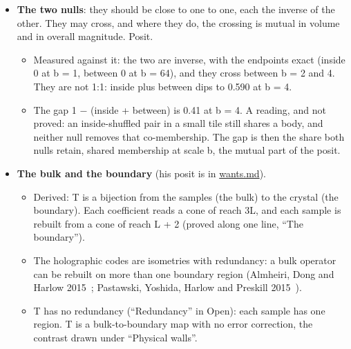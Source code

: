 \begin{itemize}
\begin{itemize}
\item Derived: E is a sum over edges, and a departure is linear in E and in the draws' sums. The departure of a whole is the sum of its edges' departures, exactly: the integral of its constituents, with the edge as the constituent. The whole equals its tiles plus its seams at every tile size (proved).
\item Built: each body's curve over its box, the six bounds xmax, xmin, ymax, ymin, zmax and zmin.
\end{itemize}
\item \textbf{The two nulls}: they should be close to one to one, each the inverse of the other. They may cross, and where they do, the crossing is mutual in volume and in overall magnitude. Posit.

\begin{itemize}
\item Measured against it: the two are inverse, with the endpoints exact (inside 0 at b = 1, between 0 at b = 64), and they cross between b = 2 and 4. They are not 1:1: inside plus between dips to 0.590 at b = 4.
\item The gap 1 − (inside + between) is 0.41 at b = 4. A reading, and not proved: an inside-shuffled pair in a small tile still shares a body, and neither null removes that co-membership. The gap is then the share both nulls retain, shared membership at scale b, the mutual part of the posit.
\end{itemize}
\item \textbf{The bulk and the boundary} (his posit is in \hyperref[chap:wants]{wants.md}).

\begin{itemize}
\item Derived: T is a bijection from the samples (the bulk) to the crystal (the boundary). Each coefficient reads a cone of reach 3L, and each sample is rebuilt from a cone of reach L + 2 (proved along one line, “The boundary”).
\item The holographic codes are isometries with redundancy: a bulk operator can be rebuilt on more than one boundary region (Almheiri, Dong and Harlow 2015~\cite{src:Almheiri-Dong-and-Harlow-2015}; Pastawski, Yoshida, Harlow and Preskill 2015~\cite{src:Pastawski-Yoshida-Harlow-and-Preskill-2015}).
\item T has no redundancy (“Redundancy” in Open): each sample has one region. T is a bulk-to-boundary map with no error correction, the contrast drawn under “Physical walls”.
\end{itemize}
\end{itemize}

